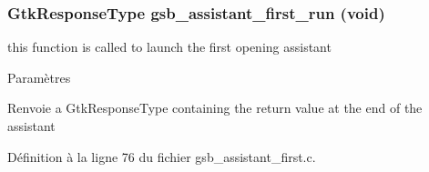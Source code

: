 \subsubsection[{gsb\_\-assistant\_\-first\_\-run}]{\setlength{\rightskip}{0pt plus 5cm}GtkResponseType gsb\_\-assistant\_\-first\_\-run (void)}\label{gsb__assistant__first_8h_a690d09449b23b2197933c554f5089a1b}
this function is called to launch the first opening assistant


\begin{DoxyParams}{Paramètres}
\item[{\em }]\end{DoxyParams}
\begin{DoxyReturn}{Renvoie}
a GtkResponseType containing the return value at the end of the assistant 
\end{DoxyReturn}


Définition à la ligne 76 du fichier gsb\_\-assistant\_\-first.c.

